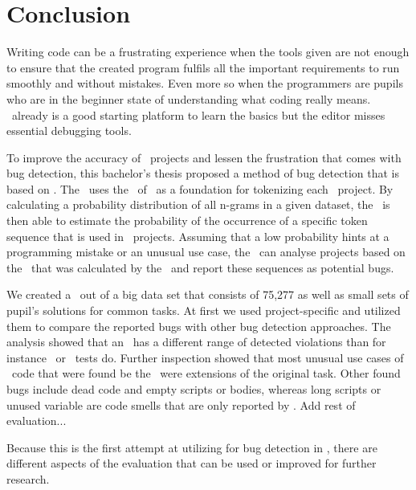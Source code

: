 \chapter{Conclusion}\label{chap:conclusion}

Writing code can be a frustrating experience when the tools given are not enough to ensure that the created program fulfils all the important requirements to run smoothly and without mistakes. Even more so when the programmers are pupils who are in the beginner state of understanding what coding really means. \scratch\ already is a good starting platform to learn the basics but the editor misses essential debugging tools.

To improve the accuracy of \scratch\ projects and lessen the frustration that comes with bug detection, this bachelor's thesis proposed a method of bug detection that is based on . The \tokenizer\ uses the \AST\ of \litterbox\ as a foundation for tokenizing each \scratch\ project. By calculating a probability distribution of all n-grams in a given dataset, the \ngramtrainer\ is then able to estimate the probability of the occurrence of a specific token sequence that is used in \scratch\ projects. Assuming that a low probability hints at a programming mistake or an unusual use case, the \ngrambugfinder\ can analyse projects based on the \ngram\ that was calculated by the \ngramtrainer\ and report these sequences as potential bugs.

We created a \ngram\ out of a big data set that consists of 75,277 as well as small sets of pupil's solutions for common tasks. At first we used project-specific  and utilized them to compare the reported bugs with other bug detection approaches. The analysis showed that an \ngram\ has a different range of detected violations than for instance \litterbox\ or \whisker\ tests do. Further inspection showed that most unusual use cases of \scratch\ code that were found be the \ngram\ were extensions of the original task. Other found bugs include dead code and empty scripts or bodies, whereas long scripts or unused variable are code smells that are only reported by \litterbox{}. Add rest of evaluation...

Because this is the first attempt at utilizing  for bug detection in \scratch{}, there are different aspects of the evaluation that can be used or improved for further research. 


